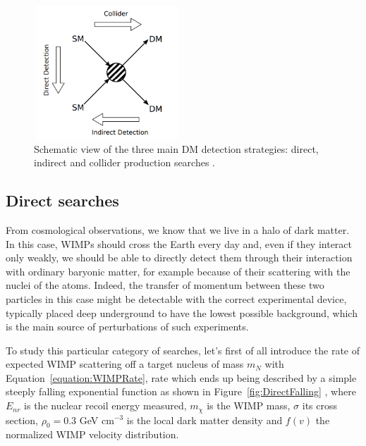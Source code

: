 \documentclass[a4paper, 10pt, openright]{report}
\begin{document}

\begin{figure}[htbp]
\begin{center}
\includegraphics[width=5.5cm, height=5cm]{figs/ThreeWays.png}
\caption{Schematic view of the three main \ac{DM} detection strategies: direct, indirect and collider production searches \cite{ColliderSearches}.}
\label{fig:ThreeWays}
\end{center}
\end{figure}

\subsection{Direct searches} \label{subsection:DirectSearches}

From cosmological observations, we know that we live in a halo of dark matter. In this case, \ac{WIMP}s should cross the Earth every day and, even if they interact only weakly, we should be able to directly detect them through their interaction with ordinary baryonic matter, for example because of their scattering with the nuclei of the atoms. Indeed, the transfer of momentum between these two particles in this case might be detectable with the correct experimental device, typically placed deep underground to have the lowest possible background, which is the main source of perturbations of such experiments. 

To study this particular category of searches, let's first of all introduce the rate of expected WIMP scattering off a target nucleus of mass $m_N$ with Equation~\ref{equation:WIMPRate}, rate which ends up being described by a simple steeply
falling exponential function as shown in Figure~\ref{fig:DirectFalling} \cite{DirectSearches}, where $E_{nr}$ is the nuclear recoil energy measured, $m_\chi$ is the \ac{WIMP} mass, $\sigma$ its cross section, $\rho_0 = 0.3$ GeV cm$^{-3}$ is the local dark matter density and $f(v)$ the normalized \ac{WIMP} velocity distribution.
\end{document}
